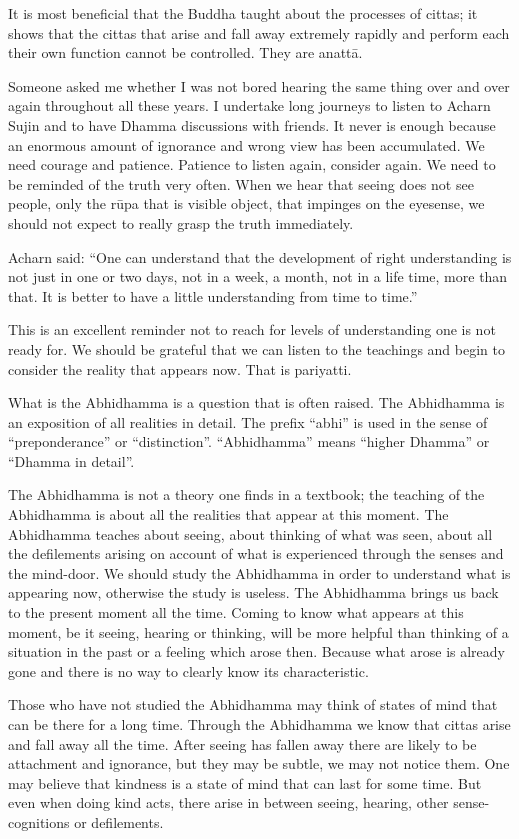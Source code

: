 {{{{{{{{{{{It is most beneficial that the Buddha
taught about the processes of cittas; it shows that the cittas that
arise and fall away extremely rapidly and perform each their own
function cannot be controlled. They are anattā. 

Someone asked me whether I was not
bored hearing the same thing over and over again throughout all these
years. I undertake long journeys to listen to Acharn Sujin and to have
Dhamma discussions with friends. It never is enough because an enormous
amount of ignorance and wrong view has been accumulated. We need courage
and patience. Patience to listen again, consider again. We need to be
reminded of the truth very often. When we hear that seeing does not see
people, only the rūpa that is visible object, that impinges on the
eyesense, we should not expect to really grasp the truth immediately. 

Acharn said: ``One can understand that
the development of right understanding is not just in one or two days,
not in a week, a month, not in a life time, more than that. It is better
to have a little understanding from time to time.'' 

This is an excellent reminder not to reach for levels of understanding
one is not ready for. We should be grateful that we can listen to the
teachings and begin to consider the reality that appears now. That is
pariyatti.

What is the Abhidhamma is a question
that is often raised. The Abhidhamma is an exposition of all realities
in detail. The prefix ``abhi'' is used in the sense of ``preponderance''
or ``distinction''. ``Abhidhamma'' means ``higher Dhamma'' or ``Dhamma
in detail''.

The Abhidhamma is not a theory one
finds in a textbook; the teaching of the Abhidhamma is about all the
realities that appear at this moment. The Abhidhamma teaches about
seeing, about thinking of what was seen, about all the defilements
arising on account of what is experienced through the senses and the
mind-door. We should study the Abhidhamma in order to understand what is
appearing now, otherwise the study is useless. The Abhidhamma brings us
back to the present moment all the time. Coming to know what appears at
this moment, be it seeing, hearing or thinking, will be more helpful
than thinking of a situation in the past or a feeling which arose then.
Because what arose is already gone and there is no way to clearly know
its characteristic.

Those who have not studied the
Abhidhamma may think of states of mind that can be there for a long
time. Through the Abhidhamma we know that cittas arise and fall away all
the time. After seeing has fallen away there are likely to be attachment
and ignorance, but they may be subtle, we may not notice them. One may
believe that kindness is a state of mind that can last for some time.
But even when doing kind acts, there arise in between seeing, hearing,
other sense-cognitions or defilements.

}}}}}}}}}}}
